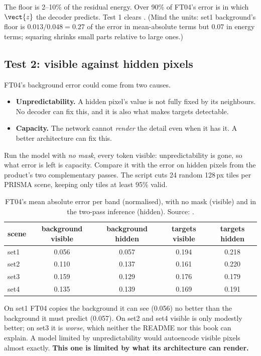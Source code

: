 The floor is 2--10\% of the residual energy. Over 90\% of FT04's error is in which $\vect{z}$ the decoder
predicts. Test 1 clears . (Mind the units: set1 background's floor is $0.013/0.048=0.27$ of
the error in mean-absolute terms but $0.07$ in energy terms; squaring shrinks small parts relative to large
ones.)

\subsection{Test 2: visible against hidden pixels}\label{sec:decoderwork:visible}

FT04's background error could come from two causes.
\begin{itemize}
\item \textbf{Unpredictability.} A hidden pixel's value is not fully fixed by its neighbours. No decoder can fix
  this, and it is also what makes targets detectable.
\item \textbf{Capacity.} The network cannot \emph{render} the detail even when it has it. A better architecture
  can fix this.
\end{itemize}
Run the model with \emph{no mask}, every token visible: unpredictability is gone, so what error is left is
capacity. Compare it with the error on hidden pixels from the product's two complementary passes. The script
 cuts 24 random 128\,px tiles per PRISMA scene, keeping only tiles at least 95\% valid.

\begin{table}[htbp]
\centering\small
\begin{tabular}{lcccc}
\toprule
scene & background visible & background hidden & targets visible & targets hidden\\
\midrule
set1 & 0.056 & 0.057 & 0.194 & 0.218\\
set2 & 0.110 & 0.137 & 0.161 & 0.220\\
set3 & 0.159 & 0.129 & 0.176 & 0.179\\
set4 & 0.135 & 0.139 & 0.169 & 0.191\\
\bottomrule
\end{tabular}
\caption{FT04's mean absolute error per band (normalised), with no mask (visible) and in the two-pass
inference (hidden). Source: .}
\label{tab:decoderwork:visible}
\end{table}

On set1 FT04 copies the background it can see (0.056) no better than the background it must predict (0.057). On
set2 and set4 visible is only modestly better; on set3 it is \emph{worse}, which neither the README nor this book
can explain. A model limited by unpredictability would autoencode visible pixels almost exactly. \textbf{This one
is limited by what its architecture can render.}

